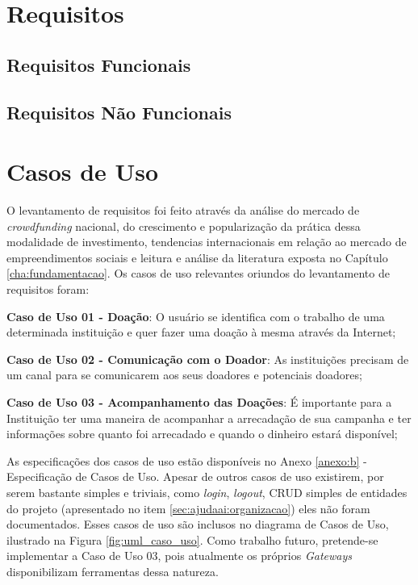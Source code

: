 \section{Requisitos}
\subsection{Requisitos Funcionais}
\subsection{Requisitos Não Funcionais}

\section{Casos de Uso} \label{sec:ctb:casos}

O levantamento de requisitos foi feito através da análise do mercado de \emph{crowdfunding} nacional, do crescimento e popularização da prática dessa modalidade de investimento, tendencias internacionais em relação ao mercado de empreendimentos sociais e leitura e análise da literatura exposta no Capítulo \ref{cha:fundamentacao}. Os casos de uso relevantes oriundos do levantamento de requisitos foram:

\begin{lista}
  \item \textbf{Caso de Uso 01 - Doação}: O usuário se identifica com o trabalho de uma determinada instituição e quer fazer uma doação à mesma através da Internet;
  \item \textbf{Caso de Uso 02 - Comunicação com o Doador}: As instituições precisam de um canal para se comunicarem aos seus doadores e potenciais doadores;
  \item \textbf{Caso de Uso 03 - Acompanhamento das Doações}: É importante para a Instituição ter uma maneira de acompanhar a arrecadação de sua campanha e ter informações sobre quanto foi arrecadado e quando o dinheiro estará disponível;
\end{lista}

As especificações dos casos de uso estão disponíveis no Anexo \ref{anexo:b} - Especificação de Casos de Uso. Apesar de outros casos de uso existirem, por serem bastante simples e triviais, como \emph{login}, \emph{logout}, CRUD simples de entidades do projeto  (apresentado no item \ref{sec:ajudaai:organizacao}) eles não foram documentados. Esses casos de uso são inclusos no diagrama de Casos de Uso, ilustrado na Figura \ref{fig:uml_caso_uso}. Como trabalho futuro, pretende-se implementar a Caso de Uso 03, pois atualmente os próprios \emph{Gateways} disponibilizam ferramentas dessa natureza.

